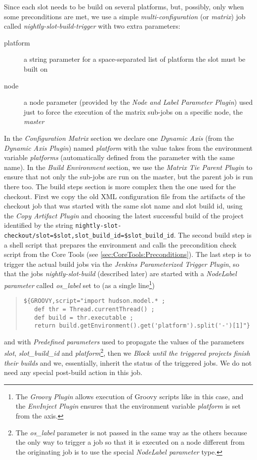 Since each slot needs to be build on several platforms, but, possibly, only when
some preconditions are met, we use a simple \emph{multi-configuration} (or
\emph{matrix}) job called \emph{nightly-slot-build-trigger} with two extra
parameters:
\begin{description}
  \item[platform] a string parameter for a space-separated list of platform the
slot must be built on
  \item[node] a node parameter (provided by the \emph{Node and Label Parameter
Plugin}) used just to force the execution of the matrix sub-jobs on a specific
node, the \emph{master}
\end{description}
In the \emph{Configuration Matrix} section we declare one \emph{Dynamic Axis}
(from the \emph{Dynamic Axis Plugin}) named \emph{platform} with the value takes
from the environment variable \emph{platforms} (automatically defined from the
parameter with the same name).  In the \emph{Build Environment} section, we use
the \emph{Matrix Tie Parent Plugin} to ensure that not only the sub-jobs are run
on the master, but the parent job is run there too.  The build steps section is
more complex then the one used for the checkout.  First we copy the old XML
configuration file from the artifacts of the checkout job that was started with
the same slot name and slot build id, using the \emph{Copy Artifact Plugin} and
choosing the latest successful build of the project identified by the string
\verb|nightly-slot-checkout/slot=$slot,slot_build_id=$slot_build_id|.  The
second build step is a shell script that prepares the environment and calls the
precondition check script from the Core Tools (see
\ref{sec:CoreTools:Preconditions}).  The last step is to trigger the actual
build
jobs via the \emph{Jenkins Parameterized Trigger Plugin}, so that the jobs
\emph{nightly-slot-build} (described later) are started with a \emph{NodeLabel
parameter} called \emph{os\_label} set to (as a single line\footnote{The
\emph{Groovy Plugin} allows execution of Groovy scripts\cite{Groovy} like in
this case, and the \emph{EnvInject Plugin} ensures that the environment variable
\emph{platform} is set from the axis.})
\begin{quote}
\begin{verbatim}
${GROOVY,script="import hudson.model.* ;
   def thr = Thread.currentThread() ;
   def build = thr.executable ;
   return build.getEnvironment().get('platform').split('-')[1]"}
\end{verbatim}
\end{quote}
and with \emph{Predefined parameters} used to propagate the values of the
parameters \emph{slot}, \emph{slot\_build\_id} and \emph{platform}\footnote{The
  \emph{os\_label} parameter is not passed in the same way as the others because
  the only way to trigger a job so that it is executed on a node different from
  the originating job is to use the special \emph{NodeLabel parameter} type.},
then we \emph{Block until the triggered projects finish their builds} and we,
essentially, inherit the status of the triggered jobs.  We do not need any
special post-build action in this job.

